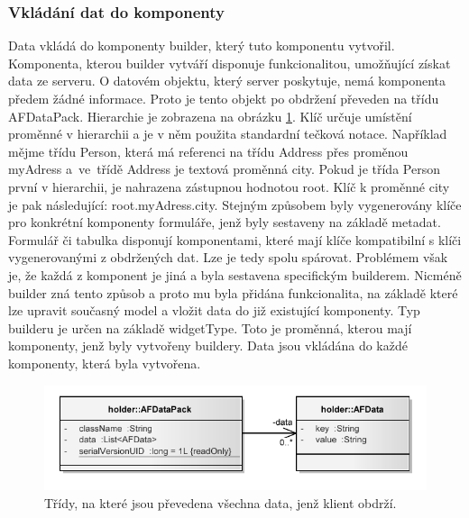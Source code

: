 \subsubsection{Vkládání dat do komponenty}
Data vkládá do komponenty builder, který tuto komponentu vytvořil. Komponenta, kterou builder vytváří disponuje funkcionalitou, umožňující získat data ze serveru. O datovém objektu, který server poskytuje, nemá komponenta předem žádné informace. Proto je tento objekt po obdržení převeden na třídu AFDataPack. Hierarchie je zobrazena na obrázku \ref{img:dataPack}. Klíč určuje umístění proměnné v hierarchii a je v něm použita standardní tečková notace. Například mějme třídu Person, která má referenci na třídu Address přes proměnou myAdress a~ve~třídě Address je textová proměnná city. Pokud je třída Person první v hierarchii, je nahrazena zástupnou hodnotou root. Klíč k proměnné city je pak následující: root.myAdress.city. Stejným způsobem byly vygenerovány klíče pro konkrétní komponenty formuláře, jenž byly sestaveny na základě metadat. Formulář či tabulka disponují komponentami, které mají klíče kompatibilní s klíči vygenerovanými z obdržených dat. Lze je tedy spolu spárovat. Problémem však je, že každá z komponent je jiná a byla sestavena specifickým builderem. Nicméně builder zná tento způsob a proto mu byla přidána funkcionalita, na základě které lze upravit současný model a vložit data do již existující komponenty. Typ builderu je určen na základě widgetType. Toto je proměnná, kterou mají komponenty, jenž byly vytvořeny buildery. Data jsou vkládána do každé komponenty, která byla vytvořena.

\begin{figure}[h!]
\begin{center}
\includegraphics{images/dataPack}
\caption{Třídy, na které jsou převedena všechna data, jenž klient obdrží.}
\label{img:dataPack}
\end{center}
\end{figure}

